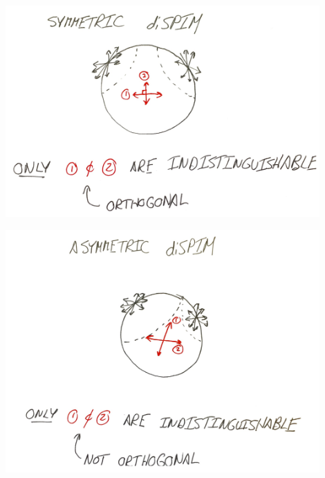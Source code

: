 \documentclass[presentation]{beamer}
\begin{document}
\begin{frame}[label=sec-3]{}
\begin{center}
  \includegraphics[width=0.9\textwidth, interpolate=true]{figs/sketch2.png}\\
\end{center}
\end{frame}

\begin{frame}[label=sec-4]{}
\begin{center}
  \includegraphics[width=0.9\textwidth, interpolate=true]{figs/sketch3.png}\\
\end{center}
\end{frame}
\end{document}
